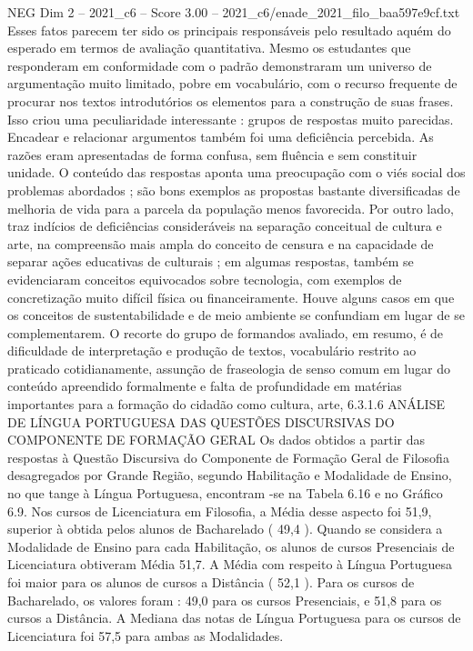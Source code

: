 \begin{textsample}{NEG Dim 2 – 2021\_c6 – Score 3.00 – 2021\_c6/enade\_2021\_filo\_baa597e9cf.txt}
Esses fatos parecem ter sido os principais responsáveis pelo resultado aquém do esperado em termos de avaliação quantitativa.
Mesmo os estudantes que responderam em conformidade com o padrão demonstraram um universo de argumentação muito limitado, pobre em vocabulário, com o recurso frequente de procurar nos textos introdutórios os elementos para a construção de suas frases.
Isso criou uma peculiaridade interessante : grupos de respostas muito parecidas.
Encadear e relacionar argumentos também foi uma deficiência percebida.
As razões eram apresentadas de forma confusa, sem fluência e sem constituir unidade.
O conteúdo das respostas aponta uma preocupação com o viés social dos problemas abordados ; são bons exemplos as propostas bastante diversificadas de melhoria de vida para a parcela da população menos favorecida.
Por outro lado, traz indícios de deficiências consideráveis na separação conceitual de cultura e arte, na compreensão mais ampla do conceito de censura e na capacidade de separar ações educativas de culturais ; em algumas respostas, também se evidenciaram conceitos equivocados sobre tecnologia, com exemplos de concretização muito difícil física ou financeiramente.
Houve alguns casos em que os conceitos de sustentabilidade e de meio ambiente se confundiam em lugar de se complementarem.
O recorte do grupo de formandos avaliado, em resumo, é de dificuldade de interpretação e produção de textos, vocabulário restrito ao praticado cotidianamente, assunção de fraseologia de senso comum em lugar do conteúdo apreendido formalmente e falta de profundidade em matérias importantes para a formação do cidadão como cultura, arte, 6.3.1.6 ANÁLISE DE LÍNGUA PORTUGUESA DAS QUESTÕES DISCURSIVAS DO COMPONENTE DE FORMAÇÃO GERAL Os dados obtidos a partir das respostas à Questão Discursiva do Componente de Formação Geral de Filosofia desagregados por Grande Região, segundo Habilitação e Modalidade de Ensino, no que tange à Língua Portuguesa, encontram -se na Tabela 6.16 e no Gráfico 6.9.
Nos cursos de Licenciatura em Filosofia, a Média desse aspecto foi 51,9, superior à obtida pelos alunos de Bacharelado ( 49,4 ).
Quando se considera a Modalidade de Ensino para cada Habilitação, os alunos de cursos Presenciais de Licenciatura obtiveram Média 51,7.
A Média com respeito à Língua Portuguesa foi maior para os alunos de cursos a Distância ( 52,1 ).
Para os cursos de Bacharelado, os valores foram : 49,0 para os cursos Presenciais, e 51,8 para os cursos a Distância.
A Mediana das notas de Língua Portuguesa para os cursos de Licenciatura foi 57,5 para ambas as Modalidades.

\end{textsample}
